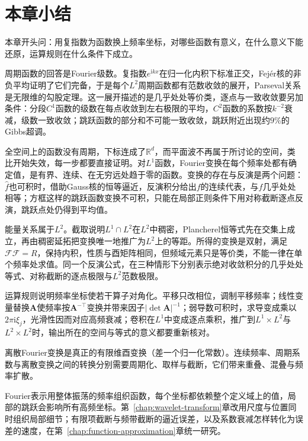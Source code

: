 \section{本章小结}
\label{sec:fourier-summary}

本章开头问：用复指数为函数换上频率坐标，对哪些函数有意义，在什么意义下能还原，运算规则在什么条件下成立。

周期函数的回答是Fourier级数。复指数$e^{\mathrm ikx}$在归一化内积下标准正交，Fejér核的非负平均证明了它们完备，于是每个$L^2$周期函数都有范数收敛的展开，Parseval关系是无限维的勾股定理。这一展开描述的是几乎处处等价类，逐点与一致收敛要另加条件：分段$C^1$函数的级数在每点收敛到左右极限的平均，$C^2$函数的系数按$k^{-2}$衰减，级数一致收敛；跳跃函数的部分和不可能一致收敛，跳跃附近出现约$9\%$的Gibbs超调。

全空间上的函数没有周期，下标连成了$\mathbb R^d$，而平面波不再属于所讨论的空间，类比开始失效，每一步都要直接证明。对$L^1$函数，Fourier变换在每个频率处都有确定值，是有界、连续、在无穷远处趋于零的函数。变换的存在与反演是两个问题：$\widehat f$也可积时，借助Gauss核的恒等逼近，反演积分给出$f$的连续代表，与$f$几乎处处相等；方框这样的跳跃函数变换不可积，只能在局部正则条件下用对称截断逐点反演，跳跃点处仍得到平均值。

能量关系属于$L^2$。截取说明$L^1\cap L^2$在$L^2$中稠密，Plancherel恒等式先在交集上成立，再由稠密延拓把变换唯一地推广为$L^2$上的等距。所得的变换是双射，满足$\mathcal F\mathcal F=R$，保持内积，性质与酉矩阵相同，但频域元素只是等价类，不能一律在单个频率处求值。同一个反演公式，在三种情形下分别表示绝对收敛积分的几乎处处等式、对称截断的逐点极限与$L^2$范数极限。

运算规则说明频率坐标使若干算子对角化。平移只改相位，调制平移频率；线性变量替换$\bm A$使频率按$\bm A^{-\top}$变换并带来因子$\lvert\det\bm A\rvert^{-1}$；弱导数可积时，求导变成乘以$2\pi\mathrm i\xi_j$，光滑性因而对应高频衰减；卷积在$L^1$中变成逐点乘积，推广到$L^1\times L^2$与$L^2\times L^2$时，输出所在的空间与等式的意义都要重新核对。

离散Fourier变换是真正的有限维酉变换（差一个归一化常数）。连续频率、周期系数与离散变换之间的转换分别需要周期化、取样与截断，它们带来重叠、混叠与频率扩散。

Fourier表示用整体振荡的频率组织函数，每个坐标都依赖整个定义域上的值，局部的跳跃会影响所有高频坐标。第~\ref{chap:wavelet-transform}章改用尺度与位置同时组织局部细节；有限项截断与频带截断的逼近误差，以及系数衰减怎样转化为误差的速度，在第~\ref{chap:function-approximation}章统一研究。
